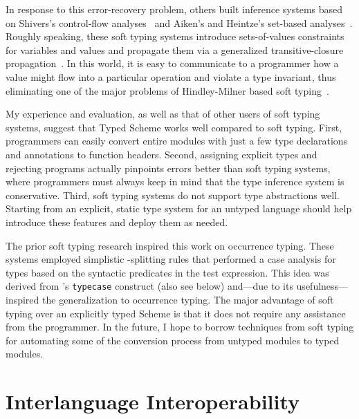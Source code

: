 \begin{schemeregion}

In response to this error-recovery problem, others built inference systems
 based on Shivers's control-flow analyses~\citeyearpar{shivers-thesis} and
 Aiken's and Heintze's set-based analyses~\cite{awl:popl94,nh:sba}. Roughly
 speaking, these soft typing systems introduce sets-of-values constraints
 for variables and values and propagate them via a generalized
 transitive-closure propagation~\cite{awl:popl94,ff:toplas99}. In this
 world, it is easy to communicate to a programmer how a value might flow
 into a particular operation and violate a type invariant, thus eliminating
 one of the major problems of Hindley-Milner based soft
 typing~\cite{ffkwf:mrspidey}.

 My experience and evaluation, as well as that of other users of soft
 typing systems, suggest that Typed Scheme works
 well compared to soft typing. First, programmers can easily
 convert entire modules with just a few type declarations and annotations
 to function headers. Second, assigning explicit types and rejecting programs
 actually pinpoints errors better than soft typing systems, where
 programmers must always keep in mind that the type inference system is
 conservative. Third, soft typing systems do not support type
 abstractions well. Starting from an explicit,
 static type system for an untyped language should help introduce these
 features and deploy them as needed. 

 The prior soft typing research inspired this work on occurrence typing.  These
 systems employed simplistic -splitting rules that performed a case
 analysis for types based on the syntactic predicates in the test
 expression. This idea was derived from \citet{c:typed-lisp}'s 
 \texttt{typecase} construct (also see below) and---due to its
 usefulness---inspired the generalization to occurrence typing.
 The major advantage of soft
 typing over an explicitly typed Scheme is that it does not require any
 assistance from the programmer. In the future, I hope to borrow
 techniques from soft typing for automating some of the conversion process
 from untyped modules to typed modules.

\section{Interlanguage Interoperability}


\end{schemeregion}
